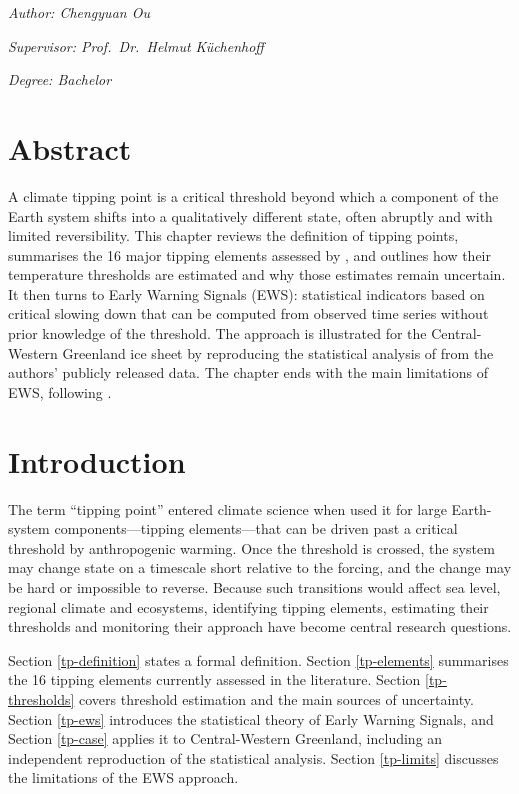 \documentclass[
]{krantz}
\begin{document}
\emph{Author: Chengyuan Ou}

\emph{Supervisor: Prof.~Dr.~Helmut Küchenhoff}

\emph{Degree: Bachelor}

\section{Abstract}\label{abstract-5}

A climate tipping point is a critical threshold beyond which a component of
the Earth system shifts into a qualitatively different state, often abruptly
and with limited reversibility. This chapter reviews the definition of
tipping points, summarises the 16 major tipping elements assessed by
\citet{armstrongmckay2022}, and outlines how their temperature thresholds are
estimated and why those estimates remain uncertain. It then turns to Early
Warning Signals (EWS): statistical indicators based on critical slowing
down that can be computed from observed time series without prior knowledge
of the threshold. The approach is illustrated for the Central-Western
Greenland ice sheet by reproducing the statistical analysis of \citet{boers2021}
from the authors' publicly released data. The chapter ends with the main
limitations of EWS, following \citet{rietkerk2025}.

\section{Introduction}\label{introduction-7}

The term ``tipping point'' entered climate science when \citet{lenton2008} used it
for large Earth-system components---tipping elements---that can be driven
past a critical threshold by anthropogenic warming. Once the threshold is
crossed, the system may change state on a timescale short relative to the
forcing, and the change may be hard or impossible to reverse. Because such
transitions would affect sea level, regional climate and ecosystems,
identifying tipping elements, estimating their thresholds and monitoring
their approach have become central research questions.

Section \ref{tp-definition} states a formal definition. Section
\ref{tp-elements} summarises the 16 tipping elements currently assessed
in the literature. Section \ref{tp-thresholds} covers threshold estimation and the main
sources of uncertainty. Section \ref{tp-ews}
introduces the statistical theory of Early Warning Signals, and Section
\ref{tp-case} applies it to Central-Western Greenland, including an
independent reproduction of the statistical analysis. Section
\ref{tp-limits} discusses the limitations of the EWS approach.
\end{document}

